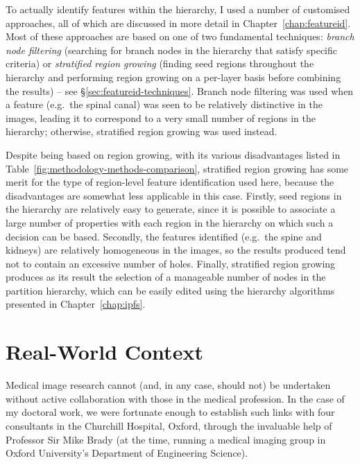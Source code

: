 To actually identify features within the hierarchy, I used a number of customised approaches, all of which are discussed in more detail in Chapter~\ref{chap:featureid}. Most of these approaches are based on one of two fundamental techniques: \emph{branch node filtering} (searching for branch nodes in the hierarchy that satisfy specific criteria) or \emph{stratified region growing} (finding seed regions throughout the hierarchy and performing region growing on a per-layer basis before combining the results) -- see \S\ref{sec:featureid-techniques}. Branch node filtering was used when a feature (e.g.~the spinal canal) was seen to be relatively distinctive in the images, leading it to correspond to a very small number of regions in the hierarchy; otherwise, stratified region growing was used instead.

Despite being based on region growing, with its various disadvantages listed in Table~\ref{fig:methodology-methods-comparison}, stratified region growing has some merit for the type of region-level feature identification used here, because the disadvantages are somewhat less applicable in this case. Firstly, seed regions in the hierarchy are relatively easy to generate, since it is possible to associate a large number of properties with each region in the hierarchy on which such a decision can be based. Secondly, the features identified (e.g.~the spine and kidneys) are relatively homogeneous in the images, so the results produced tend not to contain an excessive number of holes. Finally, stratified region growing produces as its result the selection of a manageable number of nodes in the partition hierarchy, which can be easily edited using the hierarchy algorithms presented in Chapter~\ref{chap:ipfs}.


\section{Real-World Context}


Medical image research cannot (and, in any case, should not) be undertaken without active collaboration with those in the medical profession. In the case of my doctoral work, we were fortunate enough to establish such links with four consultants in the Churchill Hospital, Oxford, through the invaluable help of Professor Sir Mike Brady (at the time, running a medical imaging group in Oxford University's Department of Engineering Science).


